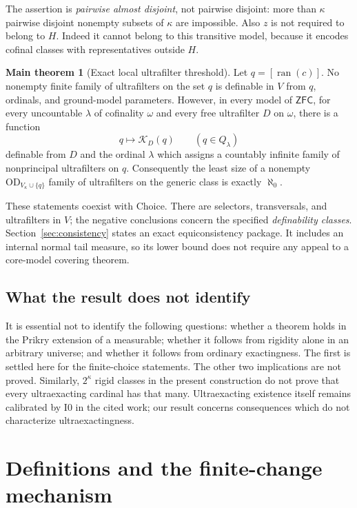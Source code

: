 \documentclass[11pt,letterpaper]{article}
\theoremstyle{definition}
\numberwithin{equation}{section}
\newcommand{\ZFC}{\mathsf{ZFC}}
\newcommand{\OD}{\mathrm{OD}}
\newtheorem{maintheorem}{Main theorem}
\begin{document}
The assertion is \emph{pairwise almost disjoint}, not pairwise disjoint: more than $\kappa$ pairwise disjoint nonempty subsets of $\kappa$ are impossible. Also $z$ is not required to belong to $H$. Indeed it cannot belong to this transitive model, because it encodes cofinal classes with representatives outside $H$.

\begin{maintheorem}[Exact local ultrafilter threshold]\label{main:ultra}
Let $q=[\operatorname{ran}(c)]$. No nonempty finite family of ultrafilters on the set $q$ is definable in $V$ from $q$, ordinals, and ground-model parameters. However, in every model of $\ZFC$, for every uncountable $\lambda$ of cofinality $\omega$ and every free ultrafilter $D$ on $\omega$, there is a function
\[
 q\longmapsto\mathcal K_D(q)\qquad(q\in Q_\lambda)
\]
definable from $D$ and the ordinal $\lambda$ which assigns a countably infinite family of nonprincipal ultrafilters on $q$. Consequently the least size of a nonempty $\OD_{V_\kappa\cup\{q\}}$ family of ultrafilters on the generic class is exactly $\aleph_0$.
\end{maintheorem}

These statements coexist with Choice. There are selectors, transversals, and ultrafilters in $V$; the negative conclusions concern the specified \emph{definability classes}. Section~\ref{sec:consistency} states an exact equiconsistency package. It includes an internal normal tail measure, so its lower bound does not require any appeal to a core-model covering theorem.

\subsection{What the result does not identify}

It is essential not to identify the following questions: whether a theorem holds in the Prikry extension of a measurable; whether it follows from rigidity alone in an arbitrary universe; and whether it follows from ordinary exactingness. The first is settled here for the finite-choice statements. The other two implications are not proved. Similarly, $2^\kappa$ rigid classes in the present construction do not prove that every ultraexacting cardinal has that many. Ultraexacting existence itself remains calibrated by $\mathrm{I0}$ in the cited work; our result concerns consequences which do not characterize ultraexactingness.\cite{abgl}

\section{Definitions and the finite-change mechanism}\label{sec:mechanism}
\end{document}
